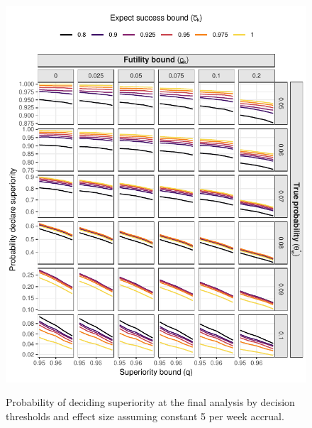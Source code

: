 \documentclass{article}
\begin{document}
\begin{figure}[!ht]
	\caption{Probability of deciding superiority at the final analysis by decision thresholds and effect size assuming constant 5 per week accrual.}
	\includegraphics{figures/superiority_5.pdf}
	\label{fig:superiority_5}
\end{figure}
\end{document}
